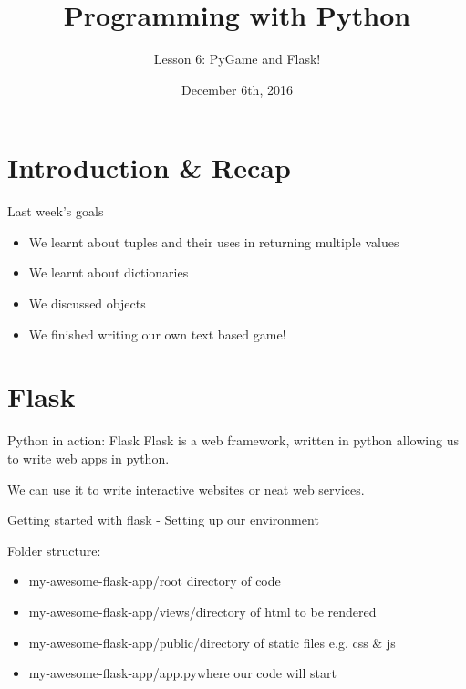 \documentclass{beamer}
\title{Programming with Python}
\subtitle{Lesson 6: PyGame and Flask!}
\date{December 6th, 2016}
\begin{document}
\begin{frame}
  \titlepage
\end{frame}


\section{Introduction \& Recap}

\begin{frame}{Last week's goals}
\pause
  \begin{itemize}
  \item We learnt about tuples and their uses in returning multiple values\pause
  \item We learnt about dictionaries\pause
  \item We discussed objects\pause
  \item We finished writing our own text based game!
  \end{itemize}  
\end{frame}

\section{Flask}

\begin{frame}{Python in action: Flask}
Flask is a web framework, written in python allowing us to write web apps in python.\\ \pause

We can use it to write interactive websites or neat web services.
\end{frame}

\begin{frame}{Getting started with flask - Setting up our environment}

\pause
Folder structure:
\begin{itemize}
  \item[] my-awesome-flask-app/\pause \qquad root directory of code
  \item[] my-awesome-flask-app/views/\pause \qquad directory of html to be rendered
  \item[] my-awesome-flask-app/public/\pause \qquad directory of static files e.g. css \& js
  \item[] my-awesome-flask-app/app.py\pause \qquad where our code will start
\end{itemize}

\end{frame}
\end{document}
